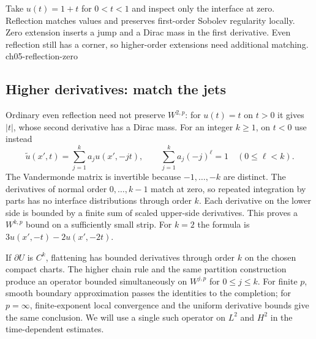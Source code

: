 {Take $u(t)=1+t$ for $0<t<1$ and inspect only the interface at zero. Reflection matches values and preserves first-order Sobolev regularity locally. Zero extension inserts a jump and a Dirac mass in the first derivative. Even reflection still has a corner, so higher-order extensions need additional matching.}
{ch05-reflection-zero}

\subsection{Higher derivatives: match the jets}
Ordinary even reflection need not preserve $W^{2,p}$: for $u(t)=t$ on
$t>0$ it gives $|t|$, whose second derivative has a Dirac mass.
For an integer $k\geq1$, on $t<0$ use instead
\[
 \widetilde u(x',t)=\sum_{j=1}^{k}a_j u(x',-jt),
 \qquad
 \sum_{j=1}^{k}a_j(-j)^\ell=1\quad(0\leq\ell<k).
\]
The Vandermonde matrix is invertible because $-1,\ldots,-k$ are distinct.
The derivatives of normal order $0,\ldots,k-1$ match at zero, so repeated
integration by parts has no interface distributions through order $k$.
Each derivative on the lower side is bounded by a finite sum of scaled
upper-side derivatives. This proves a $W^{k,p}$ bound on a sufficiently
small strip. For $k=2$ the formula is $3u(x',-t)-2u(x',-2t)$.

If $\partial U$ is $C^k$, flattening has bounded derivatives through
order $k$ on the chosen compact charts. The higher chain rule and the
same partition construction produce an operator bounded simultaneously
on $W^{j,p}$ for $0\leq j\leq k$. For finite $p$, smooth boundary
approximation passes the identities to the completion; for $p=\infty$,
finite-exponent local convergence and the uniform derivative bounds
give the same conclusion. We will use a single such operator on
$L^2$ and $H^2$ in the time-dependent estimates.
\Needspace{45mm}
